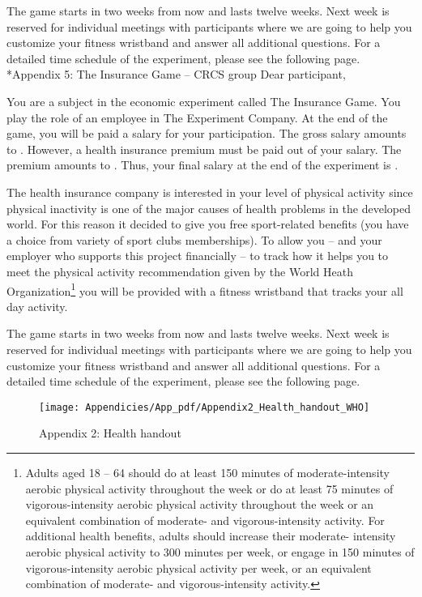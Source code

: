 \documentclass[12pt,english]{article}%
\makeatletter
\renewcommand{\subsection}{\@startsection{subsection}{2}{0mm}{-0.1\baselineskip}{0.5\baselineskip}{\normalfont\bf\flushleft}}
\makeatother
\begin{document}
The game starts in two weeks from now and lasts twelve weeks. Next week is reserved for individual meetings with participants where we are going to help you customize your fitness wristband and answer all additional questions. For a detailed time schedule of the experiment, please see the following page.
\pagebreak
\subsection*{Appendix 5: The Insurance Game -- CRCS group}
Dear participant,

You are a subject in the economic experiment called The Insurance Game. You play the role of an employee in The Experiment Company. At the end of the game, you will be paid a salary for your participation. The gross salary amounts to . However, a health insurance premium must be paid out of your salary. The premium amounts to . Thus, your final salary at the end of the experiment is .

The health insurance company is interested in your level of physical activity since physical inactivity is one of the major causes of health problems in the developed world. For this reason it decided to give you free sport-related benefits (you have a choice from variety of sport clubs memberships). To allow you – and your employer who supports this project financially – to track how it helps you to meet the physical activity recommendation given by the World Heath Organization\footnote{Adults aged 18 -- 64 should do at least 150 minutes of moderate-intensity aerobic physical activity throughout the week or do at least 75 minutes of vigorous-intensity aerobic physical activity throughout the week or an equivalent combination of moderate- and vigorous-intensity activity. For additional health benefits, adults should increase their moderate- intensity aerobic physical activity to 300 minutes per week, or engage in 150 minutes of vigorous-intensity aerobic physical activity per week, or an equivalent combination of moderate- and vigorous-intensity activity.} you will be provided with a fitness wristband that tracks your all day activity.

The game starts in two weeks from now and lasts twelve weeks. Next week is reserved for individual meetings with participants where we are going to help you customize your fitness wristband and answer all additional questions. For a detailed time schedule of the experiment, please see the following page.
\pagebreak
\begin{figure}
	\centering
	\texttt{[image: Appendicies/App\_pdf/Appendix2\_Health\_handout\_WHO]}
	\caption{Appendix 2: Health handout}
	\label{fig:Appendix2_Health_handout_WHO}
\end{figure}
\end{document}
